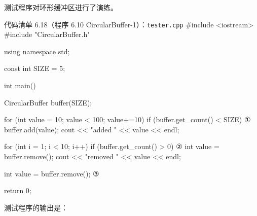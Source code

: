 \par
{}\par
{}\par
{}\par
{}\par
{}\par
{}\par
{}\par
{}\par

测试程序对环形缓冲区进行了演练。

\begin{codeboxt}{代码清单 6.18（程序 6.10 CircularBuffer-1）：\texttt{tester.\allowbreak{}cpp}}
#include <iostream>
#include "CircularBuffer.h"

using namespace std;

const int SIZE = 5;

int main()
{
    CircularBuffer buffer(SIZE);

    for (int value = 10; value < 100; value+=10)
    {
        if (buffer.get_count() < SIZE)       ①
        {
            buffer.add(value);
            cout << "added " << value << endl;
        }
    }

    for (int i = 1; i < 10; i++)
    {
        if (buffer.get_count() > 0)          ②
        {
            int value = buffer.remove();
            cout << "removed " << value << endl;
        }
    }

    int value = buffer.remove();             ③

    return 0;
}
\end{codeboxt}
\par
{}\par
{}\par

测试程序的输出是：

